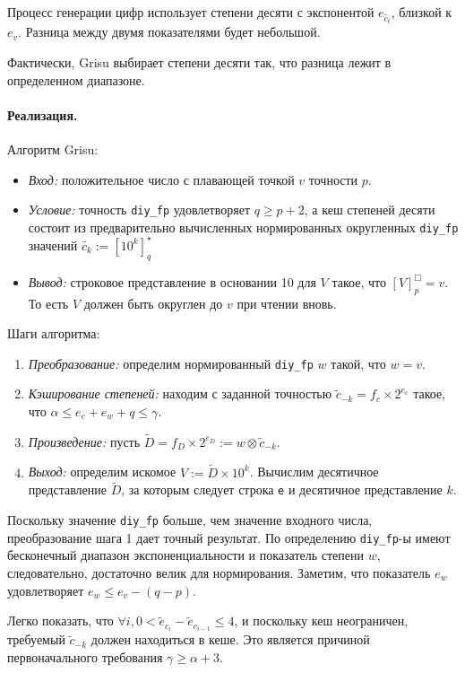 \documentclass[a4paper, 12pt, twoside]{article}
\begin{document}
Процесс генерации цифр использует степени десяти с экспонентой $e_{\tilde{c_t}}$, близкой к $e_v$. 
Разница между двумя показателями будет небольшой.

Фактически, \textsf{Grisu} выбирает степени десяти так, что разница лежит в определенном диапазоне. 

\paragraph{Реализация.}
Алгоритм \textsf{Grisu}: \begin{itemize}
\item \textit{Вход:} положительное число с плавающей точкой $v$ точности $p$.
\item \textit{Условие:} точность \texttt{diy\_fp} удовлетворяет $q \geqslant p + 2$, а кеш степеней десяти состоит из предварительно вычисленных нормированных округленных  \texttt{diy\_fp} значений $\tilde{c_k} := \left[ 10^k \right]_q^{\star}$
\item \textit{Вывод:} строковое представление в основании 10 для $V$ такое, что $[V]^{\Box}_p = v$. 
То есть $V$ должен быть округлен до $v$ при чтении вновь.
\end{itemize}

Шаги алгоритма:
\begin{enumerate}
\item \textit{Преобразование:} определим нормированный \texttt{diy\_fp} $w$ такой, что $w = v$.
\item \textit{Кэширование степеней:} находим с заданной точностью $\tilde{c}_{-k} = f_c \times 2^{e_c}$ такое, что $\alpha \leqslant e_c + e_w + q \leqslant \gamma$.
\item \textit{Произведение:} пусть $\tilde{D} = f_D \times 2^{e_D} := w \otimes \tilde{c}_{-k}$.
\item \textit{Выход:} определим искомое $V := \tilde{D} \times 10^k$. 
Вычислим десятичное представление $\tilde{D}$, за которым следует строка \texttt{e} и десятичное представление $k$.
\end{enumerate}
Поскольку значение \texttt{diy\_fp} больше, чем значение входного числа, преобразование шага 1 дает точный результат. 
По определению \texttt{diy\_fp}-ы имеют бесконечный диапазон экспоненциальности и показатель степени $w$, следовательно, достаточно велик для нормирования. 
Заметим, что показатель $e_w$ удовлетворяет $e_w \leqslant e_v - (q - p)$. 

Легко показать, что $\forall i, 0 < \tilde{e}_{c_i} - \tilde{e}_{c_{i-1}} \leqslant 4$, и поскольку кеш неограничен, требуемый $\tilde{c}_{-k}$ должен находиться в кеше. 
Это является причиной первоначального требования $\gamma \geqslant \alpha + 3$.
\end{document}
